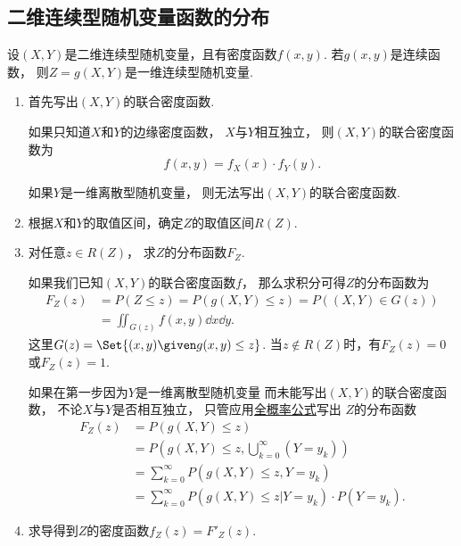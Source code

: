 \subsection{二维连续型随机变量函数的分布}
设\((X,Y)\)是二维连续型随机变量，且有密度函数\(f(x,y)\).
若\(g(x,y)\)是连续函数，
则\(Z = g(X,Y)\)是一维连续型随机变量.
\begin{enumerate}
	\item 首先写出\((X,Y)\)的联合密度函数.

	如果只知道\(X\)和\(Y\)的边缘密度函数，
	\(X\)与\(Y\)相互独立，
	则\((X,Y)\)的联合密度函数为\[
		f(x,y) = f_X(x) \cdot f_Y(y).
	\]

	如果\(Y\)是一维离散型随机变量，
	则无法写出\((X,Y)\)的联合密度函数.

	\item 根据\(X\)和\(Y\)的取值区间，确定\(Z\)的取值区间\(R(Z)\).

	\item 对任意\(z \in R(Z)\)，
	求\(Z\)的分布函数\(F_Z\).

	如果我们已知\((X,Y)\)的联合密度函数\(f\)，
	那么求积分可得\(Z\)的分布函数为\begin{align*}
		F_Z(z) &= P(Z \leq z)
		= P(g(X,Y) \leq z)
		= P((X,Y) \in G(z)) \\
		&= \iint_{G(z)} f(x,y) \dd{x}\dd{y}.
	\end{align*}
	这里\(G(z) = \Set{ (x,y) \given g(x,y) \leq z }\).
	当\(z \notin R(Z)\)时，有\(F_Z(z)=0\)或\(F_Z(z)=1\).

	如果在第一步因为\(Y\)是一维离散型随机变量
	而未能写出\((X,Y)\)的联合密度函数，
	不论\(X\)与\(Y\)是否相互独立，
	只管应用\hyperref[equation:条件概率.全概率公式]{全概率公式}写出
	\(Z\)的分布函数\begin{align*}
		F_Z(z)
		&= P(g(X,Y) \leq z) \\
		&= P\left( g(X,Y) \leq z, \bigcup_{k=0}^\infty (Y = y_k) \right) \\
		&= \sum_{k=0}^\infty P\left( g(X,Y) \leq z, Y = y_k \right) \\
		&= \sum_{k=0}^\infty P(g(X,Y) \leq z \vert Y = y_k) \cdot P(Y = y_k).
	\end{align*}

	\item 求导得到\(Z\)的密度函数\(f_Z(z) = F'_Z(z)\).
\end{enumerate}

